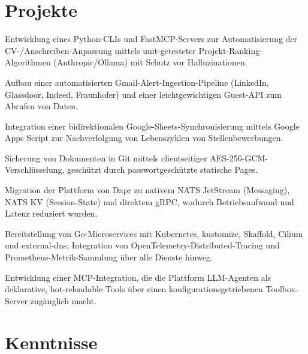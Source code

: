 \documentclass[10pt,a4paper]{resume}
\begin{document}
\section{Projekte}

\bullets
  \item Entwicklung eines Python-CLIs und FastMCP-Servers zur Automatisierung der CV-/Anschreiben-Anpassung mittels unit-getesteter Projekt-Ranking-Algorithmen (Anthropic/Ollama) mit Schutz vor Halluzinationen.
  \item Aufbau einer automatisierten Gmail-Alert-Ingestion-Pipeline (LinkedIn, Glassdoor, Indeed, Fraunhofer) und einer leichtgewichtigen Guest-API zum Abrufen von Daten.
  \item Integration einer bidirektionalen Google-Sheets-Synchronisierung mittels Google Apps Script zur Nachverfolgung von Lebenszyklen von Stellenbewerbungen.
  \item Sicherung von Dokumenten in Git mittels clientseitiger AES-256-GCM-Verschlüsselung, geschützt durch passwortgeschützte statische Pages.
\bulletsend
\vspace{1.0pt}
\bullets
  \item Migration der Plattform von Dapr zu nativem NATS JetStream (Messaging), NATS KV (Session-State) und direktem gRPC, wodurch Betriebsaufwand und Latenz reduziert wurden.
  \item Bereitstellung von Go-Microservices mit Kubernetes, kustomize, Skaffold, Cilium und external-dns; Integration von OpenTelemetry-Distributed-Tracing und Prometheus-Metrik-Sammlung über alle Dienste hinweg.
  \item Entwicklung einer MCP-Integration, die die Plattform LLM-Agenten als deklarative, hot-reloadable Tools über einen konfigurationsgetriebenen Toolbox-Server zugänglich macht.
\bulletsend

\section{Kenntnisse}
\end{document}

